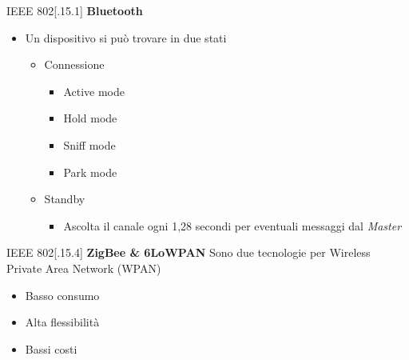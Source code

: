 \begin{frame}{IEEE 802[.15.1]}
\textbf{Bluetooth}
\begin{itemize}[<+- | alert@+>]
	\item Un dispositivo si può trovare in due stati
	\begin{itemize}[<+- | alert@+>]
		\item Connessione
		\begin{itemize}[<+- | alert@+>]
			\item Active mode
			\item Hold mode
			\item Sniff mode
			\item Park mode
		\end{itemize}
		\item Standby
		\begin{itemize}[<+- | alert@+>]
			\item Ascolta il canale ogni 1,28 secondi per eventuali messaggi dal \textit{Master}
		\end{itemize}
	\end{itemize}
\end{itemize}
\end{frame}

\begin{frame}{IEEE 802[.15.4]}
\textbf{ZigBee \& 6LoWPAN}
	\newline
	Sono due tecnologie per Wireless Private Area Network (WPAN)
	\begin{itemize}[<+- | alert@+>]
		\item Basso consumo
		\item Alta flessibilità
		\item Bassi costi
	\end{itemize}
\end{frame}

